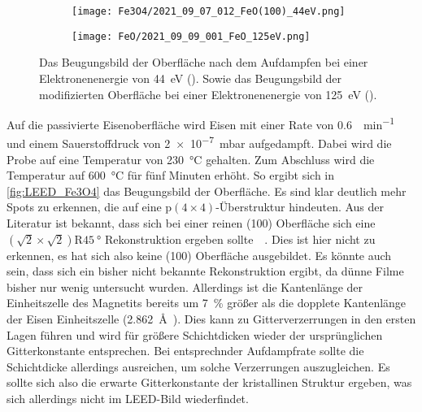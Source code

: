         \begin{figure}
            \begin{subfigure}[t]{0.48\textwidth}
                \centering
                \texttt{[image: Fe3O4/2021\_09\_07\_012\_FeO(100)\_44eV.png]}
                \subcaption{}
                \label{fig:LEED_Fe3O4}
            \end{subfigure}
            \begin{subfigure}[t]{0.48\textwidth}
                \centering
                \texttt{[image: FeO/2021\_09\_09\_001\_FeO\_125eV.png]}
                \subcaption{}
                \label{fig:LEED_FeO}
            \end{subfigure}
            \caption{Das Beugungsbild der Oberfläche nach dem Aufdampfen bei einer Elektronenenergie von \SI{44}{\electronvolt} ().
            Sowie das Beugungsbild der modifizierten Oberfläche bei einer Elektronenenergie von \SI{125}{\electronvolt} ().}
        \end{figure}
        Auf die passivierte Eisenoberfläche wird Eisen mit einer Rate von \SI{0.6}{\ML\per\minute} und einem Sauerstoffdruck von \SI{2e-7}{\milli\bar} aufgedampft.
        Dabei wird die Probe auf eine Temperatur von \SI{230}{\celsius} gehalten.
        Zum Abschluss wird die Temperatur auf \SI{600}{\celsius} für fünf Minuten erhöht.
        So ergibt sich in \autoref{fig:LEED_Fe3O4} das Beugungsbild der Oberfläche.
        Es sind klar deutlich mehr Spots zu erkennen, die auf eine $\text{p}(4 \times 4)$-Überstruktur hindeuten.
        Aus der Literatur ist bekannt, dass sich bei einer reinen (100) Oberfläche sich eine $(\sqrt{2}\times\sqrt{2})\text{R}\SI{45}{\degree}$ Rekonstruktion ergeben sollte~~\cite{ruwisch_vsm-untersuchung_2016}.
        Dies ist hier nicht zu erkennen, es hat sich also keine (100) Oberfläche ausgebildet.
        Es könnte auch sein, dass sich ein bisher nicht bekannte Rekonstruktion ergibt, da dünne Filme bisher nur wenig untersucht wurden.
        Allerdings ist die Kantenlänge der Einheitszelle des Magnetits bereits um \SI{7}{\percent} größer als die dopplete Kantenlänge der Eisen Einheitszelle (\SI{2.862}{\angstrom}~\cite{springer_database}).
        Dies kann zu Gitterverzerrungen in den ersten Lagen führen und wird für größere Schichtdicken wieder der ursprünglichen Gitterkonstante entsprechen.
        Bei entsprechnder Aufdampfrate sollte die Schichtdicke allerdings ausreichen, um solche Verzerrungen auszugleichen.
        Es sollte sich also die erwarte Gitterkonstante der kristallinen Struktur ergeben, was sich allerdings nicht im LEED-Bild wiederfindet.

